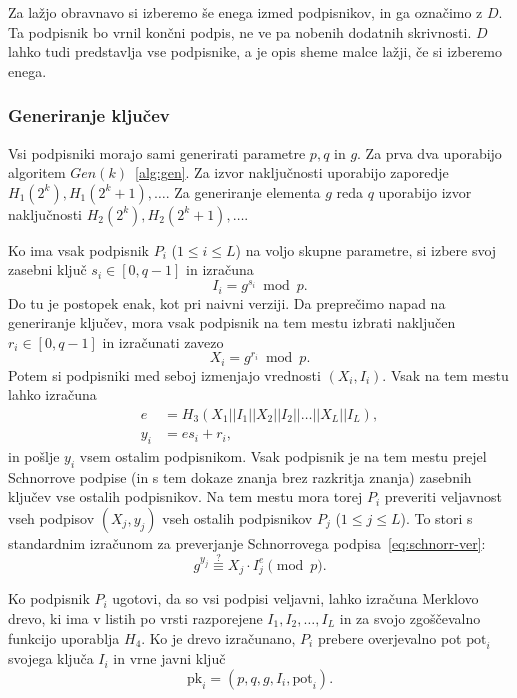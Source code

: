 \documentclass[isrm2, tisk]{fmfdelo}
\begin{document}
Za lažjo obravnavo si izberemo še enega izmed podpisnikov, in ga označimo z $D$. Ta podpisnik bo 
vrnil končni podpis, ne ve pa nobenih dodatnih skrivnosti. $D$ lahko tudi predstavlja vse podpisnike, 
a je opis sheme malce lažji, če si izberemo enega.

\subsubsection{Generiranje ključev}
Vsi podpisniki morajo sami generirati parametre $p, q$ in $g$. Za prva dva uporabijo algoritem 
$Gen(k)$~\ref{alg:gen}. Za izvor naključnosti uporabijo zaporedje $H_1(2^k), H_1(2^k + 1), \dots$.
Za generiranje elementa $g$ reda $q$ uporabijo izvor naključnosti $H_2(2^k), H_2(2^k + 1), \dots$.

Ko ima vsak podpisnik $P_i$ ($1 \le i \le L$) na voljo skupne parametre, si izbere svoj zasebni 
ključ $s_i \in [0, q - 1]$ in izračuna
$$ 
I_i = g^{s_i} \bmod p.
$$
Do tu je postopek enak, kot pri naivni verziji. Da preprečimo napad na generiranje ključev, mora 
vsak podpisnik na tem mestu izbrati naključen $r_i \in [0, q- 1]$ in izračunati zavezo
$$ 
X_i = g^{r_i} \bmod p.
$$
Potem si podpisniki med seboj izmenjajo vrednosti $(X_i, I_i)$. Vsak na tem mestu lahko izračuna
\begin{align*}
    e &= H_3(X_1 || I_1 || X_2 || I_2 || \dots || X_L || I_L), \\
    y_i &= e s_i + r_i,
\end{align*}
in pošlje $y_i$ vsem ostalim podpisnikom. Vsak podpisnik je na tem mestu prejel Schnorrove podpise
(in s tem dokaze znanja brez razkritja znanja) zasebnih ključev vse ostalih podpisnikov. Na tem mestu
mora torej $P_i$ preveriti veljavnost vseh podpisov $(X_j, y_j)$ vseh ostalih podpisnikov $P_j$ 
($1 \le j \le L$). To stori s standardnim izračunom za preverjanje Schnorrovega podpisa~\eqref{eq:schnorr-ver}: 
$$
g^{y_j} \stackrel{?}{\equiv} X_j \cdot I_j^{e} \pmod p.
$$

Ko podpisnik $P_i$ ugotovi, da so vsi podpisi veljavni, lahko izračuna Merklovo drevo, ki ima v 
listih po vrsti razporejene $I_1, I_2, \dots, I_L$ in za svojo zgoščevalno funkcijo uporablja $H_4$.
Ko je drevo izračunano, $P_i$ prebere overjevalno pot $\text{pot}_i$ svojega ključa $I_i$ in vrne 
javni ključ
$$ 
\text{pk}_i = (p, q, g, I_i, \text{pot}_i).
$$
\end{document}
